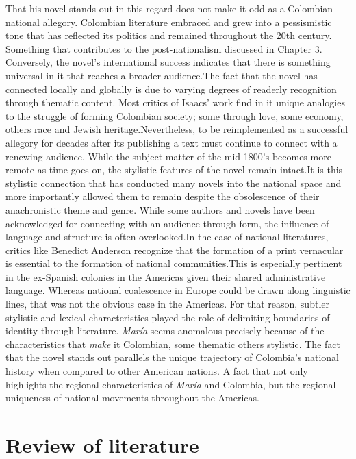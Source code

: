 That his novel stands out in this regard does not make it odd as a Colombian national allegory. 
Colombian literature embraced and grew into a pessismistic tone that has reflected its politics and remained throughout the 20th century.
Something that contributes to the post-nationalism discussed in Chapter 3.
Conversely, the novel's international success indicates that there is something universal in it that reaches a broader audience.The fact that the novel has connected locally and globally is due to varying degrees of readerly recognition through thematic content.
Most critics of Isaacs' work find in it unique analogies to the struggle of forming Colombian society; some through love, some economy, others race and Jewish heritage.Nevertheless, to be reimplemented as a successful allegory for decades after its publishing a text must continue to connect with a renewing audience.
While the subject matter of the mid-1800's becomes more remote as time goes on, the stylistic features of the novel remain intact.It is this stylistic connection that has conducted many novels into the national space and more importantly allowed them to remain despite the obsolescence of their anachronistic theme and genre.
While some authors and novels have been acknowledged for connecting with an audience through form, the influence of language and structure is often overlooked.In the case of national literatures, critics like Benedict Anderson recognize that the formation of a print vernacular is essential to the formation of national communities.This is especially pertinent in the ex-Spanish colonies in the Americas given their shared administrative language. 
Whereas national coalescence in Europe could be drawn along linguistic lines, that was not the obvious case in the Americas. For that reason, subtler stylistic and lexical characteristics played the role of delimiting boundaries of identity through literature. 
\textit{María} seems anomalous precisely because of the characteristics that \textit{make} it Colombian, some thematic others stylistic.
The fact that the novel stands out parallels the unique trajectory of Colombia's national history when compared to other American nations. 
A fact that not only highlights the regional characteristics of \textit{María} and Colombia, but the regional uniqueness of national movements throughout the Americas.


\section{Review of literature}
